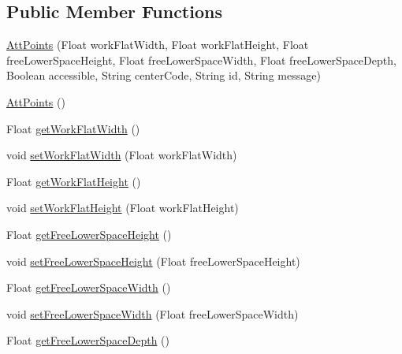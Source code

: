 \subsection*{Public Member Functions}
\begin{DoxyCompactItemize}
\item 
\mbox{\hyperlink{classcom_1_1osoc_1_1oncera_1_1javabean_1_1_att_points_a53cc61d2a58f48ad4375473e05d181f4}{Att\+Points}} (Float work\+Flat\+Width, Float work\+Flat\+Height, Float free\+Lower\+Space\+Height, Float free\+Lower\+Space\+Width, Float free\+Lower\+Space\+Depth, Boolean accessible, String center\+Code, String id, String message)
\item 
\mbox{\hyperlink{classcom_1_1osoc_1_1oncera_1_1javabean_1_1_att_points_a0e9d467cf48437ca8977e6f81696567f}{Att\+Points}} ()
\item 
Float \mbox{\hyperlink{classcom_1_1osoc_1_1oncera_1_1javabean_1_1_att_points_a227aa80644bf7c87f54844586e27f342}{get\+Work\+Flat\+Width}} ()
\item 
void \mbox{\hyperlink{classcom_1_1osoc_1_1oncera_1_1javabean_1_1_att_points_a1847be539ce801d1c0ace779eb4b5043}{set\+Work\+Flat\+Width}} (Float work\+Flat\+Width)
\item 
Float \mbox{\hyperlink{classcom_1_1osoc_1_1oncera_1_1javabean_1_1_att_points_afcb2fe0cd40d08f52b1eee425c3e9e1c}{get\+Work\+Flat\+Height}} ()
\item 
void \mbox{\hyperlink{classcom_1_1osoc_1_1oncera_1_1javabean_1_1_att_points_a1d07791c13462ca3e0216c80b4d67494}{set\+Work\+Flat\+Height}} (Float work\+Flat\+Height)
\item 
Float \mbox{\hyperlink{classcom_1_1osoc_1_1oncera_1_1javabean_1_1_att_points_aa99135a90a9e42e19d1012122ee21ca7}{get\+Free\+Lower\+Space\+Height}} ()
\item 
void \mbox{\hyperlink{classcom_1_1osoc_1_1oncera_1_1javabean_1_1_att_points_af5f0aab1fb1b2d0b75b5bc8a95e7ae63}{set\+Free\+Lower\+Space\+Height}} (Float free\+Lower\+Space\+Height)
\item 
Float \mbox{\hyperlink{classcom_1_1osoc_1_1oncera_1_1javabean_1_1_att_points_a394ad163283b69cfad1c0ee704707c34}{get\+Free\+Lower\+Space\+Width}} ()
\item 
void \mbox{\hyperlink{classcom_1_1osoc_1_1oncera_1_1javabean_1_1_att_points_a7ef5e5425373502688550362376d63e6}{set\+Free\+Lower\+Space\+Width}} (Float free\+Lower\+Space\+Width)
\item 
Float \mbox{\hyperlink{classcom_1_1osoc_1_1oncera_1_1javabean_1_1_att_points_a5f87e75d8abc7bd579d83d48efc29f9e}{get\+Free\+Lower\+Space\+Depth}} ()

\end{DoxyCompactItemize}

